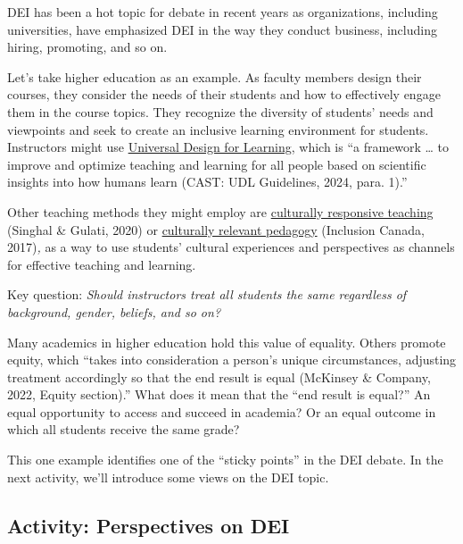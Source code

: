 \documentclass[
  letterpaper,
  DIV=11,
  numbers=noendperiod]{scrreprt}
\begin{document}
DEI has been a hot topic for debate in recent years as organizations,
including universities, have emphasized DEI in the way they conduct
business, including hiring, promoting, and so on.

Let's take higher education as an example. As faculty members design
their courses, they consider the needs of their students and how to
effectively engage them in the course topics. They recognize the
diversity of students' needs and viewpoints and seek to create an
inclusive learning environment for students. Instructors might use
\href{https://udlguidelines.cast.org/}{Universal Design for Learning},
which is ``a framework \ldots{} to improve and optimize teaching and
learning for all people based on scientific insights into how humans
learn (CAST: UDL Guidelines, 2024, para. 1).''

Other teaching methods they might employ are
\href{https://www.facultyfocus.com/articles/equality-inclusion-and-diversity/five-essential-strategies-to-embrace-culturally-responsive-teaching/}{culturally
responsive teaching} (Singhal \& Gulati, 2020) or
\href{http://www.inclusioncanada.net/culturallyrelevantpedagogy.html}{culturally
relevant pedagogy} (Inclusion Canada, 2017)\emph{,} as a way to use
students' cultural experiences and perspectives as channels for
effective teaching and learning.

Key question: \emph{Should instructors treat all students the same
regardless of background, gender, beliefs, and so on?}

Many academics in higher education hold this value of equality. Others
promote equity, which ``takes into consideration a person's unique
circumstances, adjusting treatment accordingly so that the end result is
equal (McKinsey \& Company, 2022, Equity section).'' What does it mean
that the ``end result is equal?'' An equal opportunity to access and
succeed in academia? Or an equal outcome in which all students receive
the same grade?

This one example identifies one of the ``sticky points'' in the DEI
debate. In the next activity, we'll introduce some views on the DEI
topic.

\subsection{Activity: Perspectives on
DEI}\label{activity-perspectives-on-dei}
\end{document}
